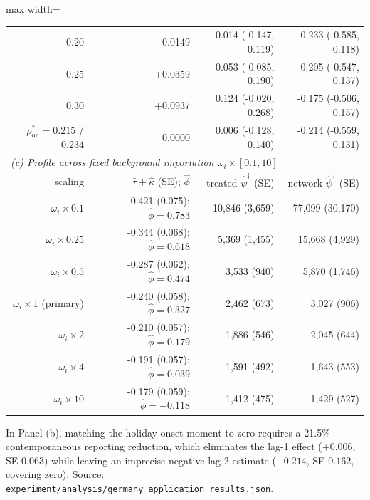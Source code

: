 \begin{table}[!t]
\begin{adjustbox}{max width=\linewidth}
\begin{tabular}{rrrr}
0.20 & -0.0149 & -0.014 (-0.147, 0.119) & -0.233 (-0.585, 0.118) \\
0.25 & +0.0359 & 0.053 (-0.085, 0.190) & -0.205 (-0.547, 0.137) \\
0.30 & +0.0937 & 0.124 (-0.020, 0.268) & -0.175 (-0.506, 0.157) \\
$\rho^*_{\mathrm{on}} = 0.215$ / $0.234$ & 0.0000 & 0.006 (-0.128, 0.140) & -0.214 (-0.559, 0.131) \\
\midrule
\multicolumn{4}{l}{\emph{(c) Profile across fixed background importation $\omega_i \times [0.1, 10]$}} \\
scaling & $\hat\tau+\hat\kappa$ (SE); $\hat\phi$ & treated $\hat\psi^\dagger$ (SE) & network $\hat\psi^\dagger$ (SE) \\
\midrule
$\omega_i \times 0.1$ & -0.421 (0.075); $\hat\phi=0.783$ & 10,846 (3,659) & 77,099 (30,170) \\
$\omega_i \times 0.25$ & -0.344 (0.068); $\hat\phi=0.618$ & 5,369 (1,455) & 15,668 (4,929) \\
$\omega_i \times 0.5$ & -0.287 (0.062); $\hat\phi=0.474$ & 3,533 (940) & 5,870 (1,746) \\
$\omega_i \times 1$ (primary) & -0.240 (0.058); $\hat\phi=0.327$ & 2,462 (673) & 3,027 (906) \\
$\omega_i \times 2$ & -0.210 (0.057); $\hat\phi=0.179$ & 1,886 (546) & 2,045 (644) \\
$\omega_i \times 4$ & -0.191 (0.057); $\hat\phi=0.039$ & 1,591 (492) & 1,643 (553) \\
$\omega_i \times 10$ & -0.179 (0.059); $\hat\phi=-0.118$ & 1,412 (475) & 1,429 (527) \\
\bottomrule
\end{tabular}
\end{adjustbox}
\par\smallskip\parbox{\linewidth}{\scriptsize In Panel (b), matching the holiday-onset moment to zero requires a 21.5\% contemporaneous reporting reduction, which eliminates the lag-1 effect ($+0.006$, SE $0.063$) while leaving an imprecise negative lag-2 estimate ($-0.214$, SE $0.162$, covering zero). Source: \texttt{experiment/analysis/germany\_application\_results.json}.}
\end{table}
